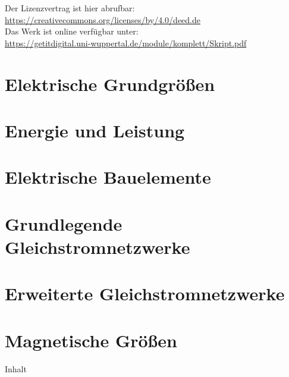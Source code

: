 \documentclass[twoside, a4paper]{article}
\begin{document}
Der Lizenzvertrag ist hier abrufbar:\\
\url{https://creativecommons.org/licenses/by/4.0/deed.de}\\
Das Werk ist online verfügbar unter:\\
\url{https://getitdigital.uni-wuppertal.de/module/komplett/Skript.pdf}
\newpage

{\setlength{\parskip}{0.05ex}    %
	\tableofcontents
	\newpage
}

\printnomenclature
\cleardoublepage

\pagestyle{fancyplain}
\fancyfoot[EL,OR]{}

\cleardoublepage
\part{Elektrische Grundgrößen}

\cleardoublepage
\part{Energie und Leistung}

\cleardoublepage
\part{Elektrische Bauelemente}

\cleardoublepage
\part{Grundlegende Gleichstromnetzwerke}

\cleardoublepage
\part{Erweiterte Gleichstromnetzwerke}

\cleardoublepage
\part{Magnetische Größen}
{Inhalt}
\end{document}
